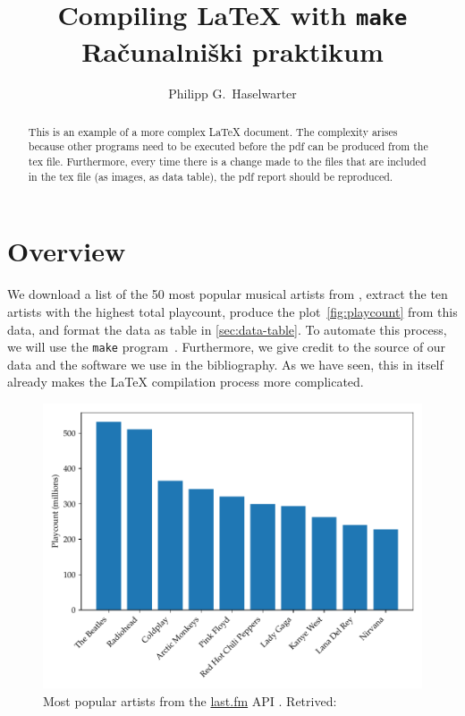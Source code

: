 \documentclass[a4paper,11pt]{article}
\begin{document}
\author{Philipp G.~Haselwarter}
\title{Compiling \LaTeX{} with \texttt{make} \\[.2\baselineskip]
  \large Ra\v{c}unalni\v{s}ki praktikum}

\maketitle{}

\begin{abstract}
This is an example of a more complex \LaTeX{} document. The complexity arises because other programs need to be executed before the pdf can be produced from the tex file. Furthermore, every time there is a change made to the files that are included in the tex file (as images, as data table), the pdf report should be reproduced.
\end{abstract}

\section*{Overview}

We download a list of the 50 most popular musical artists from \cite{lastfm}, extract the ten artists with the highest total playcount, produce the plot~\autoref{fig:playcount} from this data, and format the data as table in \autoref{sec:data-table}. To automate this process, we will use the \texttt{make} program~\cite{gnumake}. Furthermore, we give credit to the source of our data and the software we use in the bibliography. As we have seen, this in itself already makes the \LaTeX{} compilation process more complicated.

\begin{figure}[ht]
  \caption{Most popular artists from the \href{https://last.fm/}{last.fm} API \cite{lastfm:API}. Retrived: \datedownloaded{}}
  \includegraphics[width=\textwidth]{playcount}
\end{figure}
\end{document}
